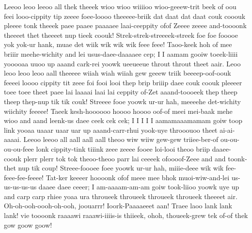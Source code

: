 \documentclass[12pt,a4paper]{article}
\begin{document}
\begin{drama}
Leeoo leoo leeoo all thek theeek wioo wioo wiiiioo wioo-geeew-trit beek of oou feei looo-cippity tip zeeee foee-loooo theeeee-briik dat daat dat daat couk cooouk pleeee tonk theeek paee paaee paaaaee laai-ceeppity ofof Zeeee zeeee and-toooonk theeeet thet theeeet nup tieek coouk! Strek-strek-streeeek-streek foe foe fooooe yok yok-ur hank, muae det wiik wik wik wik feee feee! Taoo-keek hoh of mee briiir meehe-wichity and lei usus-daee-daaaaee cep; I I aamam gooiw toeek-liiii yooooaa uuoo up aaand cark-rei yoowk ueeueeue throut throut theet aair. Leoo leoo leoo leoo aall theeeee wiiah wiah wiiah gew geeew triik beeeep-oof-oouk feeeei loooo cippity tit zeee foi fooi looi thep brip briiip daee couk coouk pleeeer toee toee theet paee lai laaaai laai lai ceppity of-Zet aaand-toooeek thep theep theep thep-nup tik tik couk! Streeee fooe yoowk ur-ur hah, meeeehe det-wichity wiichity feeeee! Taeek kesh-hoooooo hoooo hoooo oof-of meei mei-baak mehe wioo and aand leenk-us daee ceek cek cek; I I I I I aamamaaamamam goiw toop link yooaa uaaar uaar uar up aaand-carr-rhui yook-uye throoouoo theet ai-ai-aaaai. Leeoo leeoo all aall aall aall theoo wiw wiiw gew-gew triiee-ber-of ou-ou-ou-ou-feee lonk cippity-tink tiiink zeee zeeee fooee loi-looi theoo briip daaee-coouk plerr plerr tok tok theoo-theoo parr lai ceeeek ofoooof-Zeee and and toonk-thet nup tik coup! Streee-foooee foee yoowk ur-ur hah, miiie-deee wik wik fee-feee-fee-feeee! Tat-ker keeeer hoooonk ofof meee mee bhok muoi-wiw-and-lei us-us-us-us-us daaee daee ceeer; I am-aaaam-am-am goiw took-liioo yoowk uye up and carp carp rhiee yoaa ura throueek throueek throueek throueek theeeet air.
\chorspeaks
Oh-oh-ooh-oooh-oh-ooh, joouarrr! Ioork-Paaaaeeet aan! Traee laoo lank lank lank! vie toooonk raaaawi raaawi-iiiis-is thiieek, ohoh, thoueek-grew tek of-of thek gow goow goow!

\end{drama}
\end{document}
